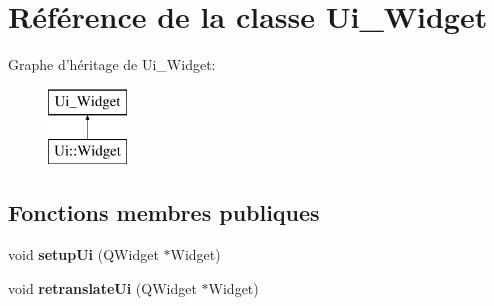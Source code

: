 \hypertarget{class_ui___widget}{\section{Référence de la classe Ui\-\_\-\-Widget}
\label{class_ui___widget}
}
Graphe d'héritage de Ui\-\_\-\-Widget\-:\begin{figure}[H]
\begin{center}
\leavevmode
\includegraphics[height=2.000000cm]{class_ui___widget}
\end{center}
\end{figure}
\subsection*{Fonctions membres publiques}
\begin{DoxyCompactItemize}
\item 
\hypertarget{class_ui___widget_a9039ed8704971418cbe19ef8c9eea266}{void {\bfseries setup\-Ui} (Q\-Widget $\ast$Widget)}\label{class_ui___widget_a9039ed8704971418cbe19ef8c9eea266}

\item 
\hypertarget{class_ui___widget_ae1cb85db8d3658df8dcd104361edcecb}{void {\bfseries retranslate\-Ui} (Q\-Widget $\ast$Widget)}\label{class_ui___widget_ae1cb85db8d3658df8dcd104361edcecb}

\end{DoxyCompactItemize}
